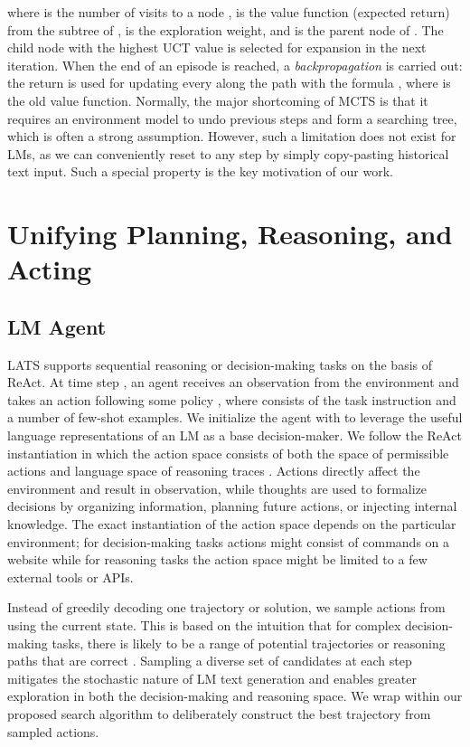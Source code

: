 \documentclass{article} \usepackage{iclr2024_conference,times}
\begin{document}
where  is the number of visits to a node ,  is the value function (expected return) from the subtree of ,  is the exploration weight, and  is the parent node of . The child node with the highest UCT value is selected for expansion in the next iteration. When the end of an episode is reached, a \textit{backpropagation} is carried out: the return  is used for updating every  along the path 
with the formula , where  is the old value function. Normally, the major shortcoming of MCTS is that it requires an environment model to undo previous steps and form a searching tree, which is often a strong assumption. However, such a limitation does not exist for LMs, as we can conveniently reset to any step by simply copy-pasting historical text input. Such a special property is the key motivation of our work. 





\section{Unifying Planning, Reasoning, and Acting}

\subsection{LM Agent} 

LATS supports sequential reasoning or decision-making tasks on the basis of ReAct. At time step , an agent receives an observation  from the environment and takes an action  following some policy , where  consists of the task instruction and a number of few-shot examples. We initialize the agent with  to leverage the useful language representations of an LM as a base decision-maker. We follow the ReAct instantiation in which the action space  consists of both the space of permissible actions  and language space of reasoning traces . Actions directly affect the environment and result in observation, while thoughts are used to formalize decisions by organizing information, planning future actions, or injecting internal knowledge. The exact instantiation of the action space depends on the particular environment; for decision-making tasks actions might consist of commands on a website while for reasoning tasks the action space might be limited to a few external tools or APIs.

Instead of greedily decoding one trajectory or solution, we sample  actions from  using the current state. This is based on the intuition that for complex decision-making tasks, there is likely to be a range of potential trajectories or reasoning paths that are correct \citep{evans2010intuition}. Sampling a diverse set of candidates at each step mitigates the stochastic nature of LM text generation and enables greater exploration in both the decision-making and reasoning space. We wrap  within our proposed search algorithm to deliberately construct the best trajectory from sampled actions.
\end{document}
